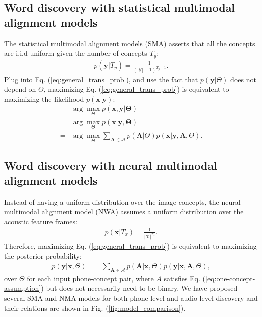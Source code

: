\documentclass[journal]{IEEEtran}
\begin{document}
\subsection{Word discovery with statistical multimodal alignment models}
 The statistical multimodal alignment models (SMA) asserts that all the concepts are i.i.d uniform given the number of concepts $T_y$:
 \begin{align}\label{eq:smt_concept_prior}
     p(\mathbf y|T_y) = \frac{1}{(|\mathcal Y|+1)^{T_y+1}}.
 \end{align}
Plug into Eq. (\ref{eq:general_trans_prob}), and use the fact that $p(\mathbf y|\Theta)$ does not depend on $\Theta$, maximizing Eq. (\ref{eq:general_trans_prob}) is equivalent to maximizing the likelihood $p(\mathbf{x}|\mathbf{y})$:
\begin{align}\label{eq:smt_trans_prob}
    &\arg \max_{\Theta} p(\mathbf{x},\mathbf{y}|\mathbf \Theta)\nonumber\\ 
    =& \arg \max_{\Theta}
    p(\mathbf{x}|\mathbf y, \mathbf \Theta)\nonumber\\
    =& \arg \max_{\Theta} \sum_{\mathbf{A} \in \mathcal A} p(\mathbf{A}|\Theta) p(\mathbf{x}| \mathbf{y}, \mathbf{A}, \Theta).
\end{align}

\subsection{Word discovery with neural multimodal alignment models}
Instead of having a uniform distribution over the image concepts, the neural multimodal alignment model (NWA) assumes a uniform distribution over the acoustic feature frames:
\begin{align}\label{eq:nmt_acoustic_prior}
    p(\mathbf x|T_x) = \frac{1}{|\mathcal X|^{T_x}}. 
\end{align}
Therefore, maximizing Eq. (\ref{eq:general_trans_prob}) is equivalent to maximizing the posterior probability:
\begin{align}\label{eq:nmt_trans_prob}
    p(\mathbf y|\mathbf x, \Theta) &= \sum_{\mathbf A \in \mathcal A} p(\mathbf A|\mathbf x, \Theta) p(\mathbf y|\mathbf x, \mathbf A, \Theta),
\end{align}
over $\Theta$ for each input phone-concept pair, where $A$ satisfies Eq. (\ref{eq:one-concept-assumption}) but does not necessarily need to be binary. We have proposed several SMA and NMA models for both phone-level and audio-level discovery and their relations are shown in Fig. (\ref{fig:model_comparison}).
\end{document}
